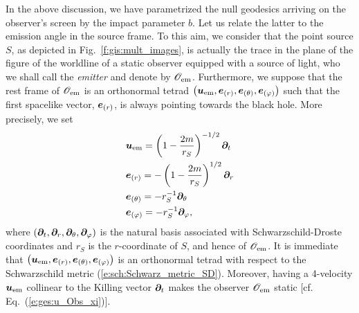 In the above discussion, we have parametrized the null geodesics arriving
on the observer's screen by the impact parameter $b$. Let us relate the latter
to the emission angle in the source frame. To this aim, we consider that
the point source $S$, as depicted in Fig.~\ref{f:gis:mult_images}, is actually
the trace in the plane of the figure of the worldline of a static observer equipped
with a source of light, who we shall call the \emph{emitter} and denote
by $\mathscr{O}_{\rm em}$. Furthermore, we suppose that the rest frame of $\mathscr{O}_{\rm em}$
is an orthonormal tetrad
$\left(\bm{u}_{\rm em}, \bm{e}_{(r)}, \bm{e}_{(\theta)}, \bm{e}_{(\varphi)}\right)$ such
that the first spacelike vector, $\bm{e}_{(r)}$, is always pointing towards the
black hole. More precisely, we set
\begin{subequations}
\label{e:gis:bo_Obs_em}
\begin{align}
& \bm{u}_{\rm em} = \left( 1 - \frac{2m}{r_S} \right)^{-1/2} \bm{\partial}_t \\
& \bm{e}_{(r)} = - \left( 1 - \frac{2m}{r_S} \right)^{1/2} \bm{\partial}_r \\
& \bm{e}_{(\theta)} = - r_S^{-1} \bm{\partial}_\theta \\
& \bm{e}_{(\varphi)} = - r_S^{-1} \bm{\partial}_\varphi ,
\end{align}
\end{subequations}
where $(\bm{\partial}_t, \bm{\partial}_r, \bm{\partial}_\theta, \bm{\partial}_\varphi)$ is the natural basis associated
with Schwarzschild-Droste coordinates and $r_S$ is the $r$-coordinate of
$S$, and hence of $\mathscr{O}_{\rm em}$.
It is immediate that $\left(\bm{u}_{\rm em}, \bm{e}_{(r)}, \bm{e}_{(\theta)}, \bm{e}_{(\varphi)}\right)$
is an orthonormal tetrad with respect to the Schwarzschild metric
(\ref{e:sch:Schwarz_metric_SD}). Moreover,
having a 4-velocity $\bm{u}_{\rm em}$ collinear to the Killing vector $\bm{\partial}_t$
makes the observer $\mathscr{O}_{\rm em}$ static [cf. Eq.~(\ref{e:ges:u_Obs_xi})].

